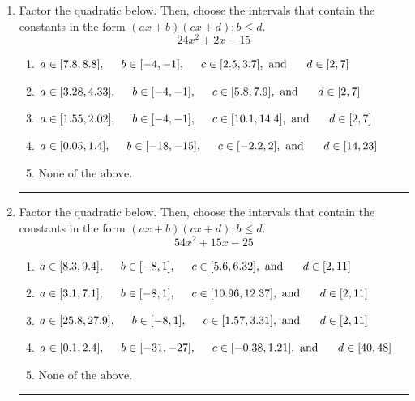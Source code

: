 \documentclass[14pt]{extbook}
\newcommand{\litem}[1]{\item#1\hspace*{-1cm}\rule{\textwidth}{0.4pt}}
\begin{document}
\begin{enumerate}
\litem{
Factor the quadratic below. Then, choose the intervals that contain the constants in the form $(ax+b)(cx+d); b \leq d.$\[ 24x^{2} +2 x -15 \]\begin{enumerate}[label=\Alph*.]
\item \( a \in [7.8, 8.8], \hspace*{5mm} b \in [-4, -1], \hspace*{5mm} c \in [2.5, 3.7], \text{ and } \hspace*{5mm} d \in [2, 7] \)
\item \( a \in [3.28, 4.33], \hspace*{5mm} b \in [-4, -1], \hspace*{5mm} c \in [5.8, 7.9], \text{ and } \hspace*{5mm} d \in [2, 7] \)
\item \( a \in [1.55, 2.02], \hspace*{5mm} b \in [-4, -1], \hspace*{5mm} c \in [10.1, 14.4], \text{ and } \hspace*{5mm} d \in [2, 7] \)
\item \( a \in [0.05, 1.4], \hspace*{5mm} b \in [-18, -15], \hspace*{5mm} c \in [-2.2, 2], \text{ and } \hspace*{5mm} d \in [14, 23] \)
\item \( \text{None of the above.} \)

\end{enumerate} }
\litem{
Factor the quadratic below. Then, choose the intervals that contain the constants in the form $(ax+b)(cx+d); b \leq d.$\[ 54x^{2} +15 x -25 \]\begin{enumerate}[label=\Alph*.]
\item \( a \in [8.3, 9.4], \hspace*{5mm} b \in [-8, 1], \hspace*{5mm} c \in [5.6, 6.32], \text{ and } \hspace*{5mm} d \in [2, 11] \)
\item \( a \in [3.1, 7.1], \hspace*{5mm} b \in [-8, 1], \hspace*{5mm} c \in [10.96, 12.37], \text{ and } \hspace*{5mm} d \in [2, 11] \)
\item \( a \in [25.8, 27.9], \hspace*{5mm} b \in [-8, 1], \hspace*{5mm} c \in [1.57, 3.31], \text{ and } \hspace*{5mm} d \in [2, 11] \)
\item \( a \in [0.1, 2.4], \hspace*{5mm} b \in [-31, -27], \hspace*{5mm} c \in [-0.38, 1.21], \text{ and } \hspace*{5mm} d \in [40, 48] \)
\item \( \text{None of the above.} \)


\end{enumerate}}
\end{enumerate}
\end{document}
